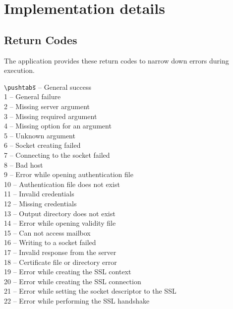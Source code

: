 \documentclass[11pt, a4paper]{article}
\begin{document}
\section{Implementation details}
\subsection{Return Codes}

The application provides these return codes to narrow down errors during execution.

\begin{tabbing}
  \verb|\pushtabs|\qquad \= \qquad \qquad\=  \>--\> General success\\
  1 \>--\> General failure\\
  2 \>--\> Missing server argument\\
  3 \>--\> Missing required argument\\
  4 \>--\> Missing option for an argument\\
  5 \>--\> Unknown argument\\
  6 \>--\> Socket creating failed\\
  7 \>--\> Connecting to the socket failed\\
  8 \>--\> Bad host\\
  9 \>--\> Error while opening authentication file\\
  10 \>--\> Authentication file does not exist\\
  11 \>--\> Invalid credentials\\
  12 \>--\> Missing credentials\\
  13 \>--\> Output directory does not exist\\
  14 \>--\> Error while opening validity file\\
  15 \>--\> Can not access mailbox\\
  16 \>--\> Writing to a socket failed\\
  17 \>--\> Invalid response from the server\\
  18 \>--\> Certificate file or directory error\\
  19 \>--\> Error while creating the SSL context\\
  20 \>--\> Error while creating the SSL connection\\
  21 \>--\> Error while setting the socket descriptor to the SSL\\
  22 \>--\> Error while performing the SSL handshake\\
\end{tabbing}
\end{document}
